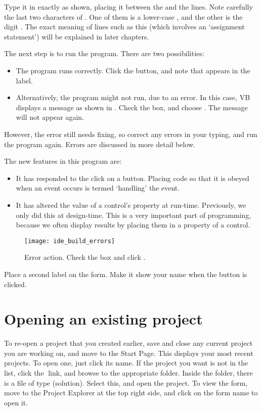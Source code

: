 		
		Type it in exactly as shown, placing it between the  and the  lines. Note carefully the last two characters of . One of them is a lower-case , and the other is the digit . The exact meaning of lines such as this (which involves an ‘assignment statement’) will be explained in later chapters.

		The next step is to run the program. There are two possibilities:
		\begin{itemize}
			\item The program runs correctly. Click the button, and note that  appears in the label.
			\item Alternatively, the program might not run, due to an error. In this case, VB displays a message as shown in . Check the box, and choose . The message will not appear again.
		\end{itemize}
		However, the error still needs fixing, so correct any errors in your typing, and run the program again. Errors are discussed in more detail below.

		The new features in this program are:
		\begin{itemize}
			\item It has responded to the click on a button. Placing code so that it is obeyed when an event occurs is termed ‘handling’ the event.
			\item It has altered the value of a control’s property at run-time. Previously, we only did this at design-time. This is a very important part of programming, because we often display results by placing them in a property of a control.
		\end{itemize}

		\begin{figure}[ht]
			\centering
			\texttt{[image: ide\_build\_errors]}
			\caption{Error action. Check the box and click .}
			\label{fig:ide_build_errors}
		\end{figure}

		\begin{stqb}
			\begin{STQ}
				\item	Place a second label on the form. Make it show your name when the button is clicked.
			\end{STQ}
		\end{stqb}

	\section{Opening an existing project}
		To re-open a project that you created earlier, save and close any current project you are working on, and move to the Start Page. This displays your most recent projects. To open one, just click its name. If the project you want is not in the list, click the  link, and browse to the appropriate folder. Inside the folder, there is a file of type  (solution). Select this, and open the project. To view the form, move to the Project Explorer at the top right side, and click on the form name to open it.
		
